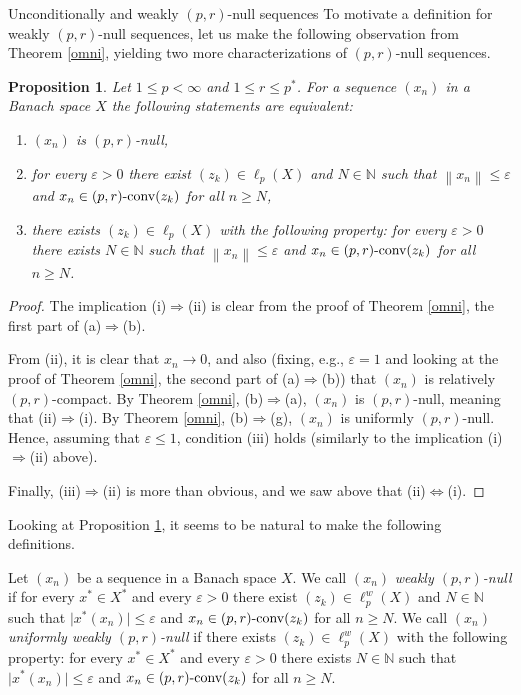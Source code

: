 \documentclass[a4paper,11pt]{amsart}
\newtheorem{prop}{Proposition}[section]
\theoremstyle{definition}
\theoremstyle{definition}
\theoremstyle{definition}
\begin{document}
\begin{section}{Unconditionally and weakly ${{(p,r)}}$-null sequences}
To motivate a definition for weakly ${{(p,r)}}$-null sequences, let us make the following observation from Theorem \ref{omni}, yielding two more characterizations of ${{(p,r)}}$-null sequences.

\begin{prop}\label{prop4.3}
Let $1 \leq p < \infty$ and $1 \leq r \leq {p^{\ast}}$. For a sequence $(x_n)$ in a Banach space $X$ the following statements are equivalent:
\begin{enumerate}

\item $(x_n)$ is $(p,r)$-null,
\item for every ${\varepsilon} >0$ there exist $(z_k)\in \ell_p(X)$ and $N\in {{\mathbb N}}$ such that ${\left\lVert {x_n} \right\rVert}\leq {\varepsilon}$ and $x_n\in {{(p,r)}} \textnormal{-conv}(z_k)$ for all $n\geq N$,
\item there exists $(z_k)\in \ell_p(X)$ with the following property: for every ${\varepsilon}>0$ there exists $N\in {{\mathbb N}}$ such that ${\left\lVert {x_n} \right\rVert}\leq {\varepsilon}$ and $x_n \in {{(p,r)}} \textnormal{-conv}(z_k)$ for all $n\geq N$.
\end{enumerate}
\end{prop}

\begin{proof}
The implication (i)$\Rightarrow$(ii) is clear from the proof of Theorem \ref{omni}, the first part of (a)$\Rightarrow$(b). 

From (ii), it is clear that $x_n{\rightarrow} 0$, and also (fixing, e.g., ${\varepsilon}=1$ and looking at the proof of Theorem \ref{omni}, the second part of (a)$\Rightarrow$(b)) that $(x_n)$ is relatively ${{(p,r)}}$-compact. By Theorem \ref{omni}, (b)$\Rightarrow $(a), $(x_n)$ is ${{(p,r)}}$-null, meaning that (ii)$\Rightarrow $(i). By Theorem \ref{omni}, (b)$\Rightarrow$(g), $(x_n)$ is uniformly ${{(p,r)}}$-null. Hence, assuming that ${\varepsilon}\leq 1$, condition (iii) holds (similarly to the implication (i)$\Rightarrow$(ii) above).

Finally, (iii)$\Rightarrow$(ii) is more than obvious, and we saw above that (ii)$\Leftrightarrow $(i).
\end{proof}

Looking at Proposition \ref{prop4.3}, it seems to be natural to make the following definitions.

Let $(x_n)$ be a sequence in a Banach space $X$. We call $(x_n)$ \emph{weakly ${{(p,r)}}$-null} if for every ${x^{\ast}} \in{X^{\ast}}$ and every ${\varepsilon}>0$ there exist $(z_k)\in \ell_p^w(X)$ and $N\in {{\mathbb N}}$ such that $\vert {x^{\ast}}(x_n) \vert \leq {\varepsilon}$ and $x_n\in {{(p,r)}} \textnormal{-conv}(z_k)$ for all $n\geq N$. We call $(x_n)$ \emph{uniformly weakly ${{(p,r)}}$-null} if there exists $(z_k)\in \ell_p^w(X)$ with the following property: for every ${x^{\ast}} \in {X^{\ast}}$ and every ${\varepsilon}>0$ there exists $N\in {{\mathbb N}}$ such that $\vert {x^{\ast}} (x_n)\vert\leq {\varepsilon}$ and $x_n \in {{(p,r)}} \textnormal{-conv}(z_k)$ for all $n\geq N$.


\end{section}
\end{document}
